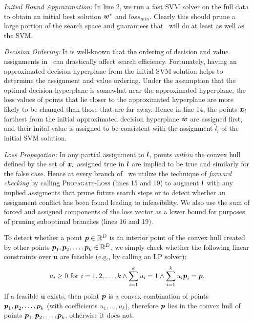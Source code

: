 \noindent \emph{Initial Bound Approximation:} In line 2, we run a fast
SVM solver on the full data to obtain an initial best solution $\boldsymbol{w}^*$
and $loss_{min}$.  Clearly this should prune a large portion of the
search space and guarantees that \BB\ will do at least as well as
the SVM.

\noindent \emph{Decision Ordering:} It is well-known that the ordering
of decision and value assignments in \BB\ can drastically affect
search efficiency.  Fortunately, having an approximated decision
hyperplane from the initial SVM solution helps to determine the
assignment and value ordering. Under the assumption that the optimal
decision hyperplane is somewhat near the approximated hyperplane, the
loss values of points that lie closer to the approximated hyperplane
are more likely to be changed than those that are far away.  Hence in
line 14, the points $\boldsymbol{x}_i$ farthest from the initial approximated
decision hyperplane $\tilde{\boldsymbol{w}}$ are assigned first, and their inital
value is assigned to be consistent with the assignment $\tilde{l}_i$
of the initial SVM solution.

\noindent \emph{Loss Propagation:} In any partial assignment to $\boldsymbol{l}$,
points \emph{within} the convex hull defined by the set of $\boldsymbol{x}_i$
assigned true in $\boldsymbol{l}$ are implied to be true and similarly for the
false case.  Hence at every branch of \BB\ we utilize the technique of
\emph{forward checking} by calling \textsc{Propagate-Loss} (lines 15
and 19) to augment $\boldsymbol{l}$ with any implied assigments that prune future
search steps or to detect whether an assignment conflict has been
found leading to infeasibility.  We also use the sum of forced and
assigned components of the loss vector as a lower bound for purposes
of pruning suboptimal branches (lines 16 and 19).

To detect whether a point $\boldsymbol{p} \in \mathbb{R}^D$ is an interior point
of the convex hull created by other points $\boldsymbol{p}_1,
\boldsymbol{p}_2, \dots, \boldsymbol{p}_k \in \mathbb{R}^D$, we simply check whether 
the following linear constraints over
$\mathbf{u}$ are feasible (e.g., by calling an LP solver):
$$
u_i \geq 0 \text{ for } i = 1,2, \dots, k \land \sum_{i=1}^k u_i = 1 \land \sum_{i=1}^k u_i \boldsymbol{p}_i = \boldsymbol{p}. 
$$ If a feasible $\mathbf{u}$ exists, then point $\boldsymbol{p}$
is a convex combination of points $\boldsymbol{p}_1, \boldsymbol{p}_2, \dots,
\boldsymbol{p}_k$ (with coefficients $u_1, \dots, u_k$), therefore $\boldsymbol{p}$ lies in the convex hull of points $\boldsymbol{p}_1, \boldsymbol{p}_2, \dots,
\boldsymbol{p}_k$, otherwise it does not.


